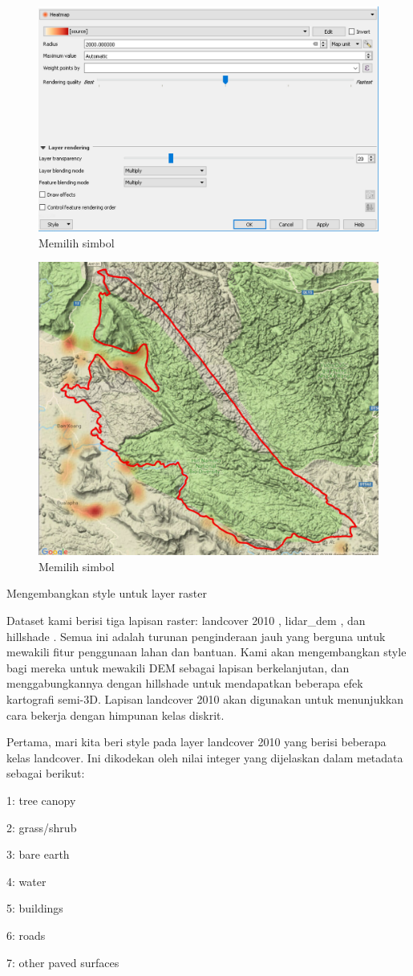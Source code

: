 \documentclass[]{book}
\begin{document}
\begin{figure}

{\centering \includegraphics[width=0.3\linewidth]{images/09/fig99} 

}

\caption{Memilih simbol}\label{fig:fig99}
\end{figure}

\begin{figure}

{\centering \includegraphics[width=0.3\linewidth]{images/09/fig9100} 

}

\caption{Memilih simbol}\label{fig:fig9100}
\end{figure}

Mengembangkan style untuk layer raster

Dataset kami berisi tiga lapisan raster: landcover 2010 , lidar\_dem , dan hillshade . Semua ini adalah turunan penginderaan jauh yang berguna untuk mewakili fitur penggunaan lahan dan bantuan. Kami akan mengembangkan style bagi mereka untuk mewakili DEM sebagai lapisan berkelanjutan, dan menggabungkannya dengan hillshade untuk mendapatkan beberapa efek kartografi semi-3D. Lapisan landcover 2010 akan digunakan untuk menunjukkan cara bekerja dengan himpunan kelas diskrit.

Pertama, mari kita beri style pada layer landcover 2010 yang berisi beberapa kelas landcover. Ini dikodekan oleh nilai integer yang dijelaskan dalam metadata sebagai berikut:

1: tree canopy

2: grass/shrub

3: bare earth

4: water

5: buildings

6: roads

7: other paved surfaces
\end{document}
